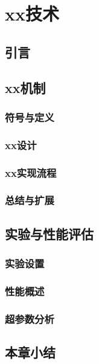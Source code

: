 \chapter{xx技术}
\label{chapter:work1}
\section{引言}
\section{xx机制}
\subsection{符号与定义}
\subsection{xx设计}
\subsection{xx实现流程}
\subsection{总结与扩展}

\section{实验与性能评估}
\subsection{实验设置}
\subsection{性能概述}
\subsection{超参数分析}

\section{本章小结}

